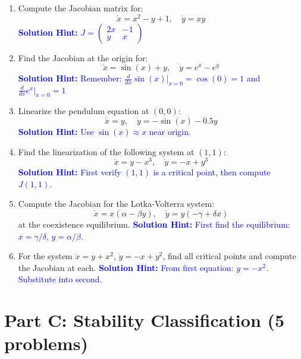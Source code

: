 \documentclass[12pt]{article}
\newcommand{\solution}[1]{\textcolor{blue}{\textbf{Solution Hint:} #1}}
\begin{document}
\begin{enumerate}[resume]
\item Compute the Jacobian matrix for:
$$\dot{x} = x^2 - y + 1, \quad \dot{y} = xy$$
\solution{$J = \begin{pmatrix} 2x & -1 \\ y & x \end{pmatrix}$}

\item Find the Jacobian at the origin for:
$$\dot{x} = \sin(x) + y, \quad \dot{y} = e^x - e^y$$
\solution{Remember: $\frac{d}{dx}\sin(x)|_{x=0} = \cos(0) = 1$ and $\frac{d}{dx}e^x|_{x=0} = 1$}

\item Linearize the pendulum equation at $(0, 0)$:
$$\dot{x} = y, \quad \dot{y} = -\sin(x) - 0.5y$$
\solution{Use $\sin(x) \approx x$ near origin.}

\item Find the linearization of the following system at $(1, 1)$:
$$\dot{x} = y - x^3, \quad \dot{y} = -x + y^3$$
\solution{First verify $(1,1)$ is a critical point, then compute $J(1,1)$.}

\item Compute the Jacobian for the Lotka-Volterra system:
$$\dot{x} = x(\alpha - \beta y), \quad \dot{y} = y(-\gamma + \delta x)$$
at the coexistence equilibrium.
\solution{First find the equilibrium: $x = \gamma/\delta$, $y = \alpha/\beta$.}

\item For the system $\dot{x} = y + x^2$, $\dot{y} = -x + y^2$, find all critical points and compute the Jacobian at each.
\solution{From first equation: $y = -x^2$. Substitute into second.}
\end{enumerate}

\section*{Part C: Stability Classification (5 problems)}
\end{document}
